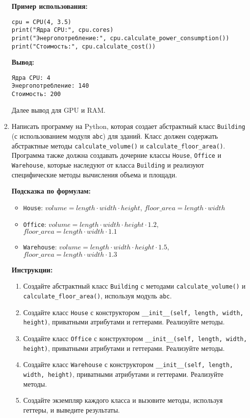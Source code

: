 \begin{enumerate}
\textbf{Пример использования:}
\begin{verbatim}
cpu = CPU(4, 3.5)
print("Ядра CPU:", cpu.cores)
print("Энергопотребление:", cpu.calculate_power_consumption())
print("Стоимость:", cpu.calculate_cost())
\end{verbatim}

\textbf{Вывод:}
\begin{verbatim}
Ядра CPU: 4
Энергопотребление: 140
Стоимость: 200
\end{verbatim}

Далее вывод для GPU и RAM.

\item
Написать программу на Python, которая создает абстрактный класс \texttt{Building} (с использованием модуля \texttt{abc}) для зданий. 
Класс должен содержать абстрактные методы \texttt{calculate\_volume()} и \texttt{calculate\_floor\_area()}. 
Программа также должна создавать дочерние классы \texttt{House}, \texttt{Office} и \texttt{Warehouse}, 
которые наследуют от класса \texttt{Building} и реализуют специфические методы вычисления объема и площади.

\textbf{Подсказка по формулам:}
\begin{itemize}
    \item \texttt{House}: $volume = length \cdot width \cdot height$, $floor\_area = length \cdot width$
    \item \texttt{Office}: $volume = length \cdot width \cdot height \cdot 1.2$, $floor\_area = length \cdot width \cdot 1.1$
    \item \texttt{Warehouse}: $volume = length \cdot width \cdot height \cdot 1.5$, $floor\_area = length \cdot width \cdot 1.3$
\end{itemize}

\textbf{Инструкции:}
\begin{enumerate}
    \item Создайте абстрактный класс \texttt{Building} с методами \texttt{calculate\_volume()} и \texttt{calculate\_floor\_area()}, используя модуль \texttt{abc}.
    \item Создайте класс \texttt{House} с конструктором \texttt{\_\_init\_\_(self, length, width, height)}, приватными атрибутами и геттерами. Реализуйте методы.
    \item Создайте класс \texttt{Office} с конструктором \texttt{\_\_init\_\_(self, length, width, height)}, приватными атрибутами и геттерами. Реализуйте методы.
    \item Создайте класс \texttt{Warehouse} с конструктором \texttt{\_\_init\_\_(self, length, width, height)}, приватными атрибутами и геттерами. Реализуйте методы.
    \item Создайте экземпляр каждого класса и вызовите методы, используя геттеры, и выведите результаты.
\end{enumerate}


\end{enumerate}

